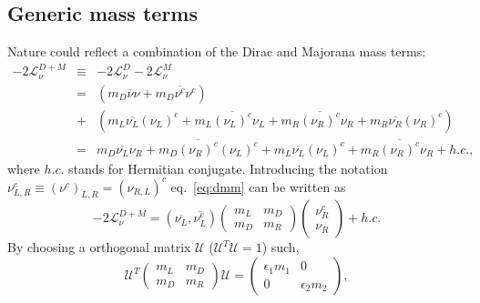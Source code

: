\subsection{Generic mass terms}
\label{sec:genma}
Nature could reflect a combination of the Dirac and Majorana mass terms:
\begin{equation}
  \label{eq:dmm}
  \begin{array}{ccl}
    -2\mathcal{L}_{\nu}^{D+M} &\equiv& -2\mathcal{L}_{\nu}^{D}             -2\mathcal{L}_{\nu}^{M}\\ &=& \displaystyle{( 
      m_{D}\overline{\nu}\nu +
      m_{D}\overline{\nu^{c}}\nu^{c} )}\\ &+& \displaystyle{(             m_{L}\overline{\nu_{L}}(\nu_{L})^{c} +                         m_{L}\overline{(\nu_{L})^{c}}\nu_{L} +                   m_{R}\overline{(\nu_{R})^{c}}\nu_{R} +                                      m_{R}\overline{\nu_{R}}(\nu_{R})^{c})}\\ &=&\displaystyle{
      m_{D}\overline{\nu_{L}}\nu_{R} +
      m_{D}\overline{(\nu_{R})^{c}}(\nu_{L})^{c} +
      m_{L}\overline{\nu_{L}}(\nu_{L})^{c} + 
      m_{R}\overline{(\nu_{R})^{c}}\nu_{R} + h.c.},
  \end{array}
\end{equation}
where $h.c.$ stands for Hermitian conjugate. Introducing the notation $\nu^{c}_{L,R} \equiv (\nu^{c})_{L,R} = (\nu_{R,L})^{c}$ eq.~\ref{eq:dmm} can be written as
\begin{equation}
  \label{eq:mm}
  -2\mathcal{L}_{\nu}^{D+M} =       \left(\overline{\nu_{L}},\overline{\nu^{c}_{L}}\right)
  \left(\begin{array}{cc}m_L & m_D \\ m_D & m_R\end{array}\right)
  \left(\begin{array}{c}\nu^{c}_R \\ \nu_R\end{array}\right) + h.c.
\end{equation}
By choosing a orthogonal matrix $\mathcal{U}$ ($\mathcal{U}^{T}
\mathcal{U} = 1$) such,
\begin{equation}
  \label{eq:mmat}
  \mathcal{U}^{T}\left(\begin{array}{cc}m_L & m_D \\ m_D &       
m_R\end{array}\right)\mathcal{U} = 
  \left(\begin{array}{cc}\epsilon_{1}m_1 & 0 \\ 0 &            
\epsilon_{2}m_2\end{array}\right),
\end{equation}
